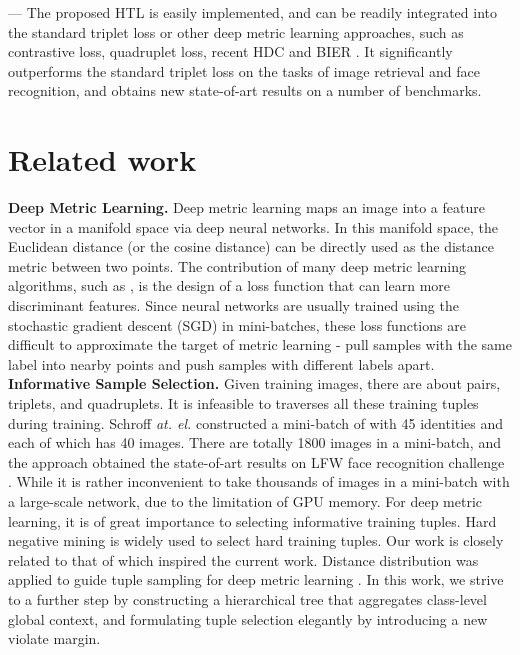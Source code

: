 \documentclass[runningheads]{llncs}
\begin{document}
--- The proposed HTL is easily implemented, and can be readily integrated into the standard triplet loss or other deep metric learning approaches, such as contrastive loss, quadruplet loss,  recent HDC \cite{Yuan_2017_ICCV} and BIER \cite{Opitz_2017_ICCV}. It significantly outperforms the standard triplet loss on the tasks of image retrieval and face recognition, and obtains new state-of-art results on a number of benchmarks.
 	\section{Related work}
\noindent\textbf{Deep Metric Learning.} Deep metric learning maps an image into a feature vector in a manifold space via deep neural networks. In this manifold space, the Euclidean distance (or the cosine distance) can be directly used as the distance metric between two points. The contribution of many deep metric learning algorithms, such as \cite{song2016deep,schroff2015facenet,Chen_2017_CVPR,bai2017regularized,bai2017ensemble}, is the design of a loss function that can learn more discriminant features. Since neural networks are usually trained using the stochastic gradient descent (SGD) in mini-batches, these loss functions are difficult to approximate the target of metric learning - pull samples with the same label into nearby points and push samples with different labels apart. \\

\noindent\textbf{Informative Sample Selection.} Given  training images, there are about  pairs,  triplets, and  quadruplets. It is infeasible to traverses all these training tuples during training. Schroff {\em at. el.} \cite{schroff2015facenet} constructed a mini-batch of with 45 identities and each of which has 40 images. There are totally 1800 images in a mini-batch, and the approach obtained the state-of-art results on LFW face recognition challenge \cite{LFWTech}. While it is rather inconvenient to take thousands of images in a mini-batch with a large-scale network, due to the limitation of GPU memory. For deep metric learning, it is of great importance to selecting informative training tuples. Hard negative mining \cite{bucher2016hard} is widely used to select hard training tuples. Our work is closely related to that of  \cite{Wu_2017_ICCV,Harwood_2017_ICCV} which inspired the current work. Distance distribution was applied to guide tuple sampling for deep metric learning \cite{Wu_2017_ICCV,Harwood_2017_ICCV}. In this work, we strive to a further step by constructing a hierarchical tree that aggregates class-level global context, and formulating tuple selection elegantly by introducing a new violate margin. \\
\end{document}
